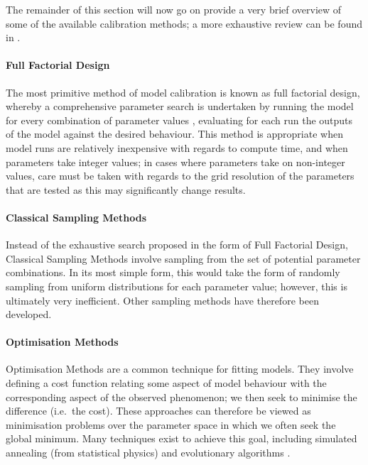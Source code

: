 The remainder of this section will now go on provide a very brief overview of
some of the available calibration methods; a more exhaustive review can be found
in \cite{thiele2014facilitating}.

\paragraph{Full Factorial Design}

The most primitive method of model calibration is known as full factorial
design, whereby a comprehensive parameter search is undertaken by running the
model for every combination of parameter values \citep{thiele2014facilitating},
evaluating for each run the outputs of the model against the desired behaviour.
This method is appropriate when model runs are relatively inexpensive with
regards to compute time, and when parameters take integer values; in cases where
parameters take on non-integer values, care must be taken with regards to the
grid resolution of the parameters that are tested as this may significantly
change results.

\paragraph{Classical Sampling Methods}

Instead of the exhaustive search proposed in the form of Full Factorial Design,
Classical Sampling Methods involve sampling from the set of potential parameter
combinations.
In its most simple form, this would take the form of randomly sampling from
uniform distributions for each parameter value; however, this is ultimately very
inefficient.
Other sampling methods have therefore been developed.

\paragraph{Optimisation Methods}

Optimisation Methods are a common technique for fitting models.
They involve defining a cost function relating some aspect of model behaviour
with the corresponding aspect of the observed phenomenon; we then seek to
minimise the difference (i.e.\ the cost).
These approaches can therefore be viewed as minimisation problems over the
parameter space in which we often seek the global minimum.
Many techniques exist to achieve this goal, including simulated annealing (from
statistical physics) \citep{kirkpatrick1983optimization} and evolutionary
algorithms \citep{duboz2010application}.

